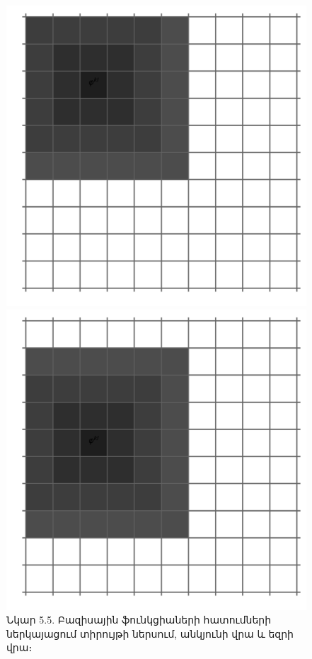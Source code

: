 \documentclass[fleqn, bachelor,subf,12pt,notitlepage]{article}
\begin{document}
\begin{figure}[H]
\begin{minipage}[b]{0.2\textwidth}
    \includegraphics[width=\textwidth]{images/two_dimensional_basis_intersection_edge_1}
  \end{minipage}
\hfill
  \begin{minipage}[b]{0.2\textwidth}
    \includegraphics[width=\textwidth]{images/two_dimensional_basis_intersection_edge_2}
  \end{minipage}
\captionsetup{labelformat=empty}
\caption{Նկար 5.5. Բազիսային ֆունկցիաների հատումների ներկայացում տիրույթի ներսում, անկյունի վրա և եզրի վրա։}
\end{figure}
\end{document}
